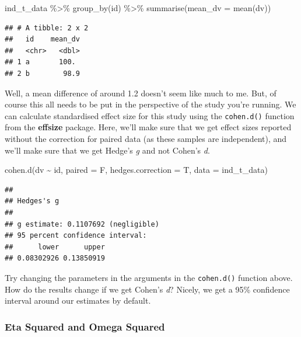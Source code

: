 \documentclass[
]{book}
\newenvironment{Shaded}{\begin{snugshade}}{\end{snugshade}}
\newcommand{\AttributeTok}[1]{\textcolor[rgb]{0.77,0.63,0.00}{#1}}
\newcommand{\FunctionTok}[1]{\textcolor[rgb]{0.00,0.00,0.00}{#1}}
\newcommand{\NormalTok}[1]{#1}
\newcommand{\SpecialCharTok}[1]{\textcolor[rgb]{0.00,0.00,0.00}{#1}}
\begin{document}
\begin{Shaded}
\begin{Highlighting}[]
\NormalTok{ind\_t\_data }\SpecialCharTok{\%\textgreater{}\%} \FunctionTok{group\_by}\NormalTok{(id) }\SpecialCharTok{\%\textgreater{}\%} \FunctionTok{summarise}\NormalTok{(}\AttributeTok{mean\_dv =} \FunctionTok{mean}\NormalTok{(dv))}
\end{Highlighting}
\end{Shaded}

\begin{verbatim}
## # A tibble: 2 x 2
##   id    mean_dv
##   <chr>   <dbl>
## 1 a       100. 
## 2 b        98.9
\end{verbatim}

Well, a mean difference of around 1.2 doesn't seem like much to me. But, of course this all needs to be put in the perspective of the study you're running. We can calculate standardised effect size for this study using the \texttt{cohen.d()} function from the \textbf{effsize} package. Here, we'll make sure that we get effect sizes reported without the correction for paired data (as these samples are independent), and we'll make sure that we get Hedge's \emph{g} and not Cohen's \emph{d}.

\begin{Shaded}
\begin{Highlighting}[]
\FunctionTok{cohen.d}\NormalTok{(dv }\SpecialCharTok{\textasciitilde{}}\NormalTok{ id, }\AttributeTok{paired =}\NormalTok{ F, }\AttributeTok{hedges.correction =}\NormalTok{ T, }\AttributeTok{data =}\NormalTok{ ind\_t\_data)}
\end{Highlighting}
\end{Shaded}

\begin{verbatim}
## 
## Hedges's g
## 
## g estimate: 0.1107692 (negligible)
## 95 percent confidence interval:
##      lower      upper 
## 0.08302926 0.13850919
\end{verbatim}

Try changing the parameters in the arguments in the \texttt{cohen.d()} function above. How do the results change if we get Cohen's \emph{d}? Nicely, we get a 95\% confidence interval around our estimates by default.

\hypertarget{eta-squared-and-omega-squared}{%
\subsubsection{Eta Squared and Omega Squared}\label{eta-squared-and-omega-squared}}
\end{document}
